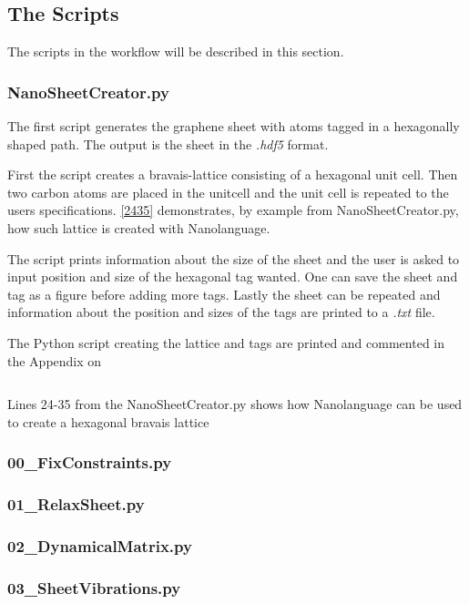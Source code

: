 
\subsection{The Scripts}
The scripts in the workflow will be described in this section.
\subsubsection{NanoSheetCreator.py}\label{NSCS}
The first script generates the graphene sheet with atoms tagged in a hexagonally shaped path. The output is the sheet in the \textit{.hdf5} format.

First the script creates a bravais-lattice consisting of a hexagonal unit cell. Then two carbon atoms are placed in the unitcell and the unit cell is repeated to the users specifications. \cref{2435} demonstrates, by example from NanoSheetCreator.py, how such lattice is created with Nanolanguage.

The script prints information about the size of the sheet and the user is asked to input position and size of the hexagonal tag wanted. One can save the sheet and tag as a figure before adding more tags. Lastly the sheet can be repeated and information about the position and sizes of the tags are printed to a \textit{.txt} file.

The Python script creating the lattice and tags are printed and commented in the Appendix on 
\onecolumngrid

\begin{listing}
 \inputminted[python3=true,bgcolor=Black,linenos=true,firstline=24,lastline=35]{python}{VNL/PythonScripts/NanoSheetCreator.py}
 \caption{Lines 24-35 from the NanoSheetCreator.py shows how Nanolanguage can be used to create a hexagonal bravais lattice}
 \label{2435}
\end{listing}
\twocolumngrid

\subsubsection{00\_FixConstraints.py}\label{00}
\subsubsection{01\_RelaxSheet.py}\label{01}
\subsubsection{02\_DynamicalMatrix.py}\label{02}
\subsubsection{03\_SheetVibrations.py}\label{03}
